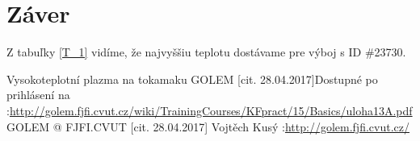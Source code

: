 \documentclass[10pt]{scrartcl}
\begin{document}
\section{Záver}

Z tabuľky \ref{T_1} vidíme, že najvyššiu teplotu dostávame pre výboj s ID \#23730.

\begin{thebibliography}{2}
Vysokoteplotní plazma na tokamaku GOLEM [cit. 28.04.2017]Dostupné po prihlásení na :\url{http://golem.fjfi.cvut.cz/wiki/TrainingCourses/KFpract/15/Basics/uloha13A.pdf}
GOLEM @ FJFI.CVUT [cit. 28.04.2017] Vojtěch Kusý :\url{http://golem.fjfi.cvut.cz/}

\end{thebibliography}
\end{document}
